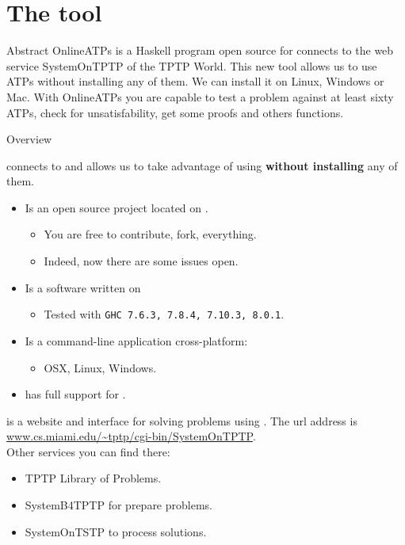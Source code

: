 \documentclass[newPxFont]{beamer}
\begin{document}
\maketitle

% 


\section{The tool}

\begin{frame}{Abstract}
OnlineATPs is a Haskell program open source for connects to the web service SystemOnTPTP of the TPTP World.
This new tool allows us to use ATPs without installing any of them. We can install it on Linux, Windows or Mac.
With OnlineATPs you are capable to test a problem against at least sixty ATPs, check for unsatisfability, get some proofs and others functions.
\end{frame}

\begin{frame}{Overview}

\onlineatps connects to \alert{\systemontptp} and allows us to take
advantage of using \alert{\atps} \textbf{without installing} any of them.
\begin{itemize}
\item Is an open source project located on .
\begin{itemize}
  \item You are free to contribute, fork, everything.
  \item Indeed, now there are some issues open.
  \end{itemize}
\item Is a software written on 
\begin{itemize}
  \item Tested with \texttt{GHC 7.6.3, 7.8.4, 7.10.3, 8.0.1}.
  \end{itemize}
\item Is a command-line application cross-platform:
\begin{itemize}
  \item OSX, Linux, Windows.
\end{itemize}
\item \apia has full support for \onlineatps.
\end{itemize}
\end{frame}

\begin{frame}
\systemontptp is a website and interface for solving problems using \atps.
The url address is \url{www.cs.miami.edu/~tptp/cgi-bin/SystemOnTPTP}.\\
Other services you can find there:
\begin{itemize}
\item TPTP Library of Problems.
\item SystemB4TPTP for prepare problems.
\item SystemOnTSTP to process solutions.
\end{itemize}
\end{frame}
\end{document}
